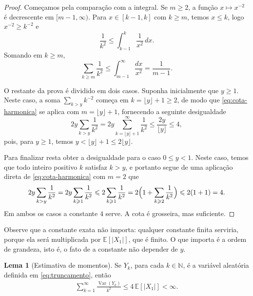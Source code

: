 \documentclass[12pt,portuguese]{article}
\theoremstyle{definition}
\newtheorem{lemma}[lemma]{Lema}
\theoremstyle{plainexercise}
\theoremstyle{starredexercise}
\theoremstyle{definition}
\begin{document}
\begin{proof}
Começamos pela comparação com a integral. Se $m\geqslant2$, a função
$x\mapsto x^{-2}$ é decrescente em $[m-1,\infty)$. Para $x\in[k-1,k]$ com
$k\geqslant m$, temos $x\leqslant k$, logo $x^{-2}\geqslant k^{-2}$ e
\[
\frac{1}{k^2}\leqslant\int_{k-1}^{k}\frac{1}{x^2}\,dx.
\]
Somando em $k\geqslant m$,
\begin{equation}\label{eq:cota-harmonica}
\sum_{k\geqslant m}\frac{1}{k^2}
\leqslant
\int_{m-1}^{\infty}\frac{dx}{x^2}
=
\frac{1}{m-1}.
\end{equation}

O restante da prova é dividido em dois casos. Suponha inicialmente que $y\geqslant1$.
Neste caso, a soma $\sum_{k>y}k^{-2}$ começa em
$k=\lfloor y\rfloor+1\geqslant2$, de modo que \eqref{eq:cota-harmonica} se
aplica com $m=\lfloor y\rfloor+1$, fornecendo a seguinte desigualdade
\[
2y\sum_{k>y}\frac{1}{k^2}
=
2y\sum_{k=\lfloor y\rfloor+1}^{\infty}\frac{1}{k^2}
\leqslant
\frac{2y}{\lfloor y\rfloor}
\leqslant
4,
\]
pois, para $y\geqslant1$, temos $y<\lfloor y\rfloor+1\leqslant2\lfloor
y\rfloor$.

Para finalizar resta obter a desigualdade para o caso $0\leqslant y<1$.
Neste caso, temos que todo inteiro positivo $k$ satisfaz
$k>y$, e portanto segue de uma aplicação direta de \eqref{eq:cota-harmonica} com $m=2$ que
\[
2y\sum_{k>y}\frac{1}{k^2}
=
2y\sum_{k\geqslant1}\frac{1}{k^2}
\leqslant
2\sum_{k\geqslant1}\frac{1}{k^2}
=
2\Bigl(1+\sum_{k\geqslant2}\frac{1}{k^2}\Bigr)
\leqslant
2(1+1)
=
4.
\]
Em ambos os casos a constante $4$ serve. A cota é grosseira, mas suficiente.
\end{proof}

Observe que a constante exata não importa: qualquer constante finita serviria,
porque ela será multiplicada por $\mathbb{E}[|X_1|]$, que é finito. O que importa
é a ordem de grandeza, isto é, o fato de a constante não depender de $y$.

\begin{lemma}[Estimativa de momentos]\label{lem:momento}
Se $Y_k$, para cada $k\in\mathbb{N}$, é a variável aleatória definida em \eqref{eq:truncamento},
então
\begin{align}\label{eq-aux3}
\sum_{k=1}^{\infty}\frac{\operatorname{Var}(Y_k)}{k^2}
\leqslant
4\,\mathbb{E}[|X_1|]
<
\infty.
\end{align}
\end{lemma}
\end{document}
